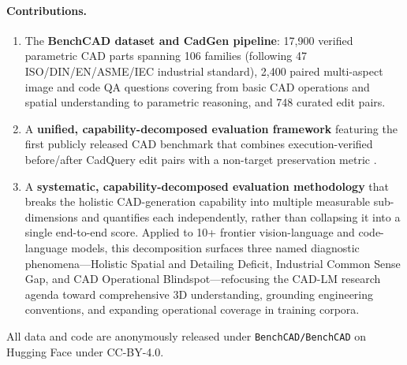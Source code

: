 \paragraph{Contributions.}
\begin{enumerate}[leftmargin=*, labelwidth=1.5em, labelsep=0.5em, topsep=-0.5em, itemsep=0em, parsep=0em]
\item The \textbf{BenchCAD dataset and CadGen pipeline}: 17{,}900 verified parametric CAD parts spanning 106 families (following 47 ISO/DIN/EN/ASME/IEC industrial standard), 2{,}400 paired multi-aspect image and code QA questions covering from basic CAD operations and spatial understanding to parametric reasoning, and 748 curated edit pairs. 
\item A \textbf{unified, capability-decomposed evaluation framework} featuring the first publicly released CAD benchmark that combines execution-verified before/after CadQuery edit pairs with a non-target preservation metric . 
\item A \textbf{systematic, capability-decomposed evaluation methodology} that breaks the holistic CAD-generation capability into multiple measurable sub-dimensions and quantifies each independently, rather than collapsing it into a single end-to-end score.
Applied to 10+ frontier vision-language and code-language models, this decomposition surfaces three named diagnostic phenomena---Holistic Spatial and Detailing Deficit, Industrial Common Sense Gap, and CAD Operational Blindspot---refocusing the CAD-LM research agenda toward comprehensive 3D understanding, grounding engineering conventions, and expanding operational coverage in training corpora.
\end{enumerate}
All data and code are anonymously released under \texttt{BenchCAD/BenchCAD} on Hugging Face under CC-BY-4.0. 
